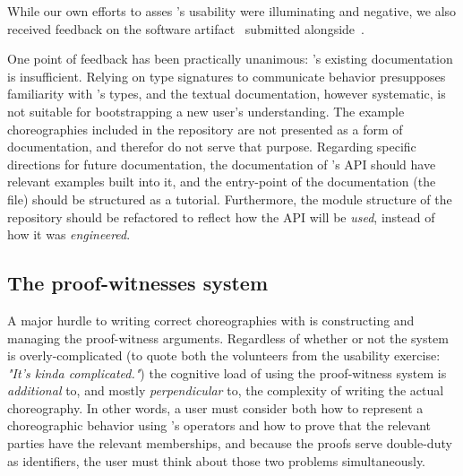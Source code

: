 While our own efforts to asses \MultiChor's usability were illuminating and negative,
we also received feedback on the software artifact~\cite{ourArtifact} submitted alongside~\cite{batesenclaves}.

One point of feedback has been practically unanimous:
\MultiChor's existing documentation is insufficient.
Relying on type signatures to communicate behavior presupposes familiarity with \MultiChor's types,
and the textual documentation, however systematic, is not suitable for bootstrapping a new user's understanding.
The example choreographies included in the \MultiChor repository are not presented as a form of documentation, 
and therefor do not serve that purpose.
Regarding specific directions for future documentation,
the documentation of \MultiChor's API should have relevant examples built into it,
and the entry-point of the documentation (the  file) should be structured as a tutorial.
Furthermore, the module structure of the repository should be refactored to reflect how the API will be \emph{used},
instead of how it was \emph{engineered}.

\subsection{The proof-witnesses system}

A major hurdle to writing correct choreographies with \MultiChor is constructing and managing the proof-witness arguments.
Regardless of whether or not the system is overly-complicated
(to quote both the volunteers from the usability exercise:
\emph{"It's kinda complicated."})
the cognitive load of using the proof-witness system is \emph{additional} to, and mostly \emph{perpendicular} to,
the complexity of writing the actual choreography.
In other words,
a user must consider both how to represent a choreographic behavior using \MultiChor's operators
and how to prove that the relevant parties have the relevant memberships,
and because the proofs serve double-duty as identifiers, the user must think about those two problems simultaneously.


